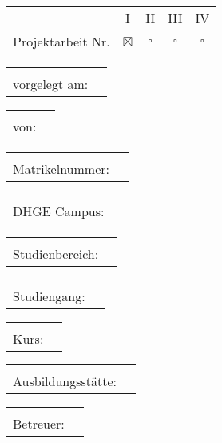 \vspace{\fill}
\maketitle

\begin{tabular}{rcccc}
	     \hspace{0.45\textwidth} &       I       &     II      &     III     &     IV      \\
	Projektarbeit Nr. & $ \boxtimes $ & $ \square $ & $ \square $ & $ \square $
\end{tabular}

\begin{tabular}{rl}
	 \hspace{0.45\textwidth} &       \\
	vorgelegt am: & \CDATUM
\end{tabular}

\begin{tabular}{rl}
	\hspace{0.45\textwidth} &              \\
	        von: & \CAUTHOR
\end{tabular}

\begin{tabular}{rl}
	\hspace{0.45\textwidth} &         \\
	 Matrikelnummer: & \CMATRIKEL
\end{tabular}

\begin{tabular}{rl}
	\hspace{0.45\textwidth} &      \\
	DHGE Campus: & \CCAMPUS
\end{tabular}

\begin{tabular}{rl}
	 \hspace{0.45\textwidth} &         \\
	Studienbereich: & \CBEREICH
\end{tabular}

\begin{tabular}{rl}
	\hspace{0.45\textwidth} &                       \\
	Studiengang: & \CSTUDIENGANG
\end{tabular}

\begin{tabular}{rl}
	\hspace{0.45\textwidth} &       \\
	       Kurs: & \CKURS
\end{tabular}

\begin{tabular}{rl}
	\hspace{0.45\textwidth} &          \\
	Ausbildungsstätte: & \CBETRIEB
\end{tabular}

\begin{tabular}{rl}
	\hspace{0.45\textwidth} &          \\
	   Betreuer: & \CBETREUER
\end{tabular}

\vspace*{\fill}

\pagebreak
